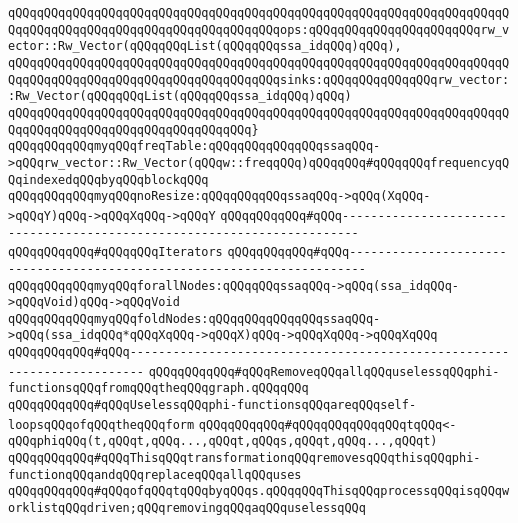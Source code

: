 \verb|qQQqqQQqqQQqqQQqqQQqqQQqqQQqqQQqqQQqqQQqqQQqqQQqqQQqqQQqqQQqqQQqqQQqqQQqqQQqqQQqqQQqqQQqqQQqqQQqqQQqqQQqqQQqops:qQQqqQQqqQQqqQQqqQQqqQQqrw_vector::Rw_Vector(qQQqqQQqList(qQQqqQQqssa_idqQQq)qQQq),|\newline
\verb|qQQqqQQqqQQqqQQqqQQqqQQqqQQqqQQqqQQqqQQqqQQqqQQqqQQqqQQqqQQqqQQqqQQqqQQqqQQqqQQqqQQqqQQqqQQqqQQqqQQqqQQqqQQqsinks:qQQqqQQqqQQqqQQqrw_vector::Rw_Vector(qQQqqQQqList(qQQqqQQqssa_idqQQq)qQQq)|\newline
\verb|qQQqqQQqqQQqqQQqqQQqqQQqqQQqqQQqqQQqqQQqqQQqqQQqqQQqqQQqqQQqqQQqqQQqqQQqqQQqqQQqqQQqqQQqqQQqqQQqqQQqqQQq}|\newline
\verb|qQQqqQQqqQQqmyqQQqfreqTable:qQQqqQQqqQQqqQQqssaqQQq->qQQqrw_vector::Rw_Vector(qQQqw::freqqQQq)qQQqqQQq#qQQqqQQqfrequencyqQQqindexedqQQqbyqQQqblockqQQq|\newline
\verb|qQQqqQQqqQQqmyqQQqnoResize:qQQqqQQqqQQqssaqQQq->qQQq(XqQQq->qQQqY)qQQq->qQQqXqQQq->qQQqY|\newline
\verb|qQQqqQQqqQQq#qQQq------------------------------------------------------------------------|\newline
\verb|qQQqqQQqqQQq#qQQqqQQqIterators|\newline
\verb|qQQqqQQqqQQq#qQQq------------------------------------------------------------------------|\newline
\verb|qQQqqQQqqQQqmyqQQqforallNodes:qQQqqQQqssaqQQq->qQQq(ssa_idqQQq->qQQqVoid)qQQq->qQQqVoid|\newline
\verb|qQQqqQQqqQQqmyqQQqfoldNodes:qQQqqQQqqQQqqQQqssaqQQq->qQQq(ssa_idqQQq*qQQqXqQQq->qQQqX)qQQq->qQQqXqQQq->qQQqXqQQq|\newline
\newline
\verb|qQQqqQQqqQQq#qQQq------------------------------------------------------------------------|\newline
\verb|qQQqqQQqqQQq#qQQqRemoveqQQqallqQQquselessqQQqphi-functionsqQQqfromqQQqtheqQQqgraph.qQQqqQQq|\newline
\verb|qQQqqQQqqQQq#qQQqUselessqQQqphi-functionsqQQqareqQQqself-loopsqQQqofqQQqtheqQQqform|\newline
\verb|qQQqqQQqqQQq#qQQqqQQqqQQqqQQqtqQQq<-qQQqphiqQQq(t,qQQqt,qQQq...,qQQqt,qQQqs,qQQqt,qQQq...,qQQqt)|\newline
\verb|qQQqqQQqqQQq#qQQqThisqQQqtransformationqQQqremovesqQQqthisqQQqphi-functionqQQqandqQQqreplaceqQQqallqQQquses|\newline
\verb|qQQqqQQqqQQq#qQQqofqQQqtqQQqbyqQQqs.qQQqqQQqThisqQQqprocessqQQqisqQQqworklistqQQqdriven;qQQqremovingqQQqaqQQquselessqQQq|\newline
